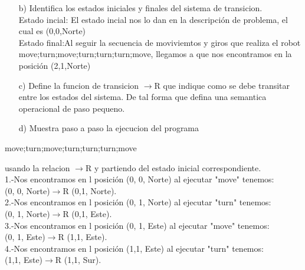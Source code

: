 \documentclass{article}
\begin{document}
\begin{itemize}
\begin{itemize}
                    \item[b)] Identifica los estados iniciales y finales del sistema de transicion.\\

                    Estado incial: El estado incial nos lo dan en la descripción de problema, el cual es (0,0,Norte)\\

                    Estado final:Al seguir la secuencia de moviviemtos y giros que realiza el robot move;turn;move;turn;turn;turn;move, llegamos a que nos encontramos en la posición (2,1,Norte)\\
                    
                    \item[c)] Define la funcion de transicion $\rightarrow$R que indique como se debe transitar entre los estados del sistema. De tal forma que defina una semantica operacional de paso pequeno.\\

                    
                    \item[d)] Muestra paso a paso la ejecucion del programa\\
                    
                \end{itemize}
                \begin{center}
                    move;turn;move;turn;turn;turn;move
                \end{center}
            usando la relacion $\rightarrow$R y partiendo del estado inicial correspondiente.\\

            1.-Nos encontramos en l posición (0, 0, Norte) al ejecutar "move" tenemos:\\
            (0, 0, Norte)$\rightarrow$R (0,1, Norte).\\

            2.-Nos encontramos en l posición (0, 1, Norte) al ejecutar "turn" tenemos:\\
            (0, 1, Norte)$\rightarrow$R (0,1, Este).\\

            3.-Nos encontramos en l posición (0, 1, Este) al ejecutar "move" tenemos:\\
            (0, 1, Este)$\rightarrow$R (1,1, Este).\\

            4.-Nos encontramos en l posición (1,1, Este) al ejecutar "turn" tenemos:\\
            (1,1, Este)$\rightarrow$R (1,1, Sur).\\


\end{itemize}
\end{document}
